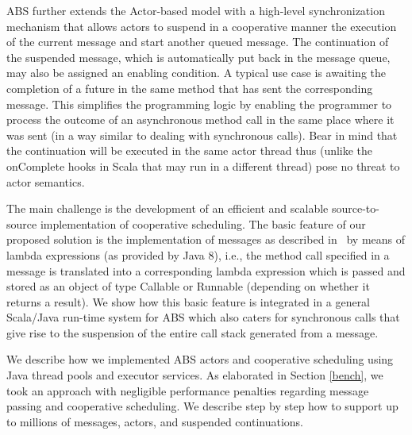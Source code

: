 ABS further extends the Actor-based model with a high-level synchronization mechanism that allows actors to suspend in a cooperative manner the execution of the current message and start another queued message. 
The continuation of the suspended message, which is automatically put back in the message queue, may also be assigned an enabling condition. 
A typical use case is awaiting the completion of a future in the same method that has sent the corresponding message.
This simplifies the programming logic by enabling the programmer to process the outcome of an asynchronous method call in the same place where it was sent (in a way similar to dealing with synchronous calls).
Bear in mind that the continuation will be executed in the same actor thread thus (unlike the {\ttfamily onComplete} hooks in Scala that may run in a different thread) pose no threat to actor semantics.

The main challenge is the development of an efficient and scalable source-to-source implementation of cooperative scheduling. 
The basic feature of our proposed solution is the implementation of messages as described in~\cite{paj8} by means of lambda expressions (as provided by Java 8), i.e., the method call specified in a message
is translated into a corresponding lambda expression which is passed and stored as
an object of type Callable or Runnable (depending on whether it returns a result). We show how this basic feature is integrated in a general Scala/Java run-time system for ABS which also caters for synchronous calls that give rise to the suspension of the entire call stack generated from a message.

We describe how we implemented ABS actors and cooperative scheduling using Java thread pools and executor services.  
As elaborated in Section \ref{bench}, we took an approach with negligible performance penalties regarding message passing and cooperative scheduling. 
We describe step by step how to support up to millions of messages, actors, and suspended continuations.


